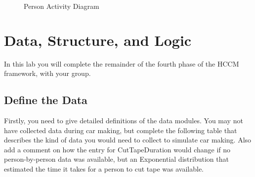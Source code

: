 \documentclass[
  10pt,
  a4paperpaper,
  DIV=11,
  numbers=noendperiod,
  oneside]{scrreprt}
\begin{document}
\begin{figure}[htbp]


\caption{\label{fig-person_act}Person Activity Diagram}

\end{figure}%

\chapter{Data, Structure, and Logic}\label{data-structure-and-logic}

In this lab you will complete the remainder of the fourth phase of the
HCCM framework, with your group.

\section{Define the Data}\label{define-the-data-1}

Firstly, you need to give detailed definitions of the data modules. You
may not have collected data during car making, but complete the
following table that describes the kind of data you would need to
collect to simulate car making. Also add a comment on how the entry for
CutTapeDuration would change if no person-by-person data was available,
but an Exponential distribution that estimated the time it takes for a
person to cut tape was available.
\end{document}
